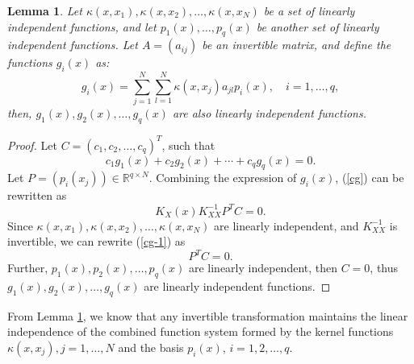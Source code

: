 \documentclass[preprint,review,sort&compress,3p]{elsarticle}
\newtheorem{lem}{Lemma }[section]
\begin{document}
\begin{lem}
	\label{lem_g}
	Let $\kappa(x, x_1), \kappa(x, x_2), \dots, \kappa(x, x_N)$ be a set of linearly independent functions, and let $p_1(x), \dots, p_q(x)$ be another set of linearly independent functions. Let $A = (a_{ij})$ be an invertible matrix, and define the functions $g_i(x)$ as:
	$$
	g_i(x) = \sum_{j=1}^N \sum_{l=1}^N \kappa(x, x_j) a_{jl} p_i(x), \quad i = 1, \dots, q,
	$$
	then, $g_1(x), g_2(x), \dots, g_q(x)$ are also linearly independent functions.
	
	
\end{lem}
\begin{proof}
	Let $C = (c_1,c_2,\dots,c_q)^T$, such that
	\begin{equation}
		\label{cg}
		c_1 g_1(x)+c_2 g_2(x)+\cdots+c_q g_q(x) = 0.
	\end{equation}
	Let $P = (p_i(x_j))\in \mathbb{R}^{q\times N}$. Combining the expression of $g_i(x)$,  (\ref{cg}) can be rewritten as
	\begin{equation}
		\label{cg-1}
		K_X(x) K_{XX}^{-1} P^T C = 0. 
	\end{equation}
	Since $\kappa(x, x_1), \kappa(x, x_2), \dots, \kappa(x, x_N)$ are linearly independent, and $K_{XX}^{-1}$ is invertible, we can rewrite (\ref{cg-1}) as
	$$
	P^TC = 0. 
	$$
	Further, $p_1(x),p_2(x),\dots,p_q(x)$ are linearly independent, then $C = 0$, thus $g_1(x),g_2(x),\dots,g_q(x)$ are linearly independent functions.
\end{proof}


From Lemma \ref{lem_g}, we know that any invertible transformation maintains the linear independence of the combined function system formed by the kernel functions $\kappa(x,x_j), j = 1,\dots,N$ and the basis $p_i(x)$, $i = 1,2, \dots, q$.
\end{document}
